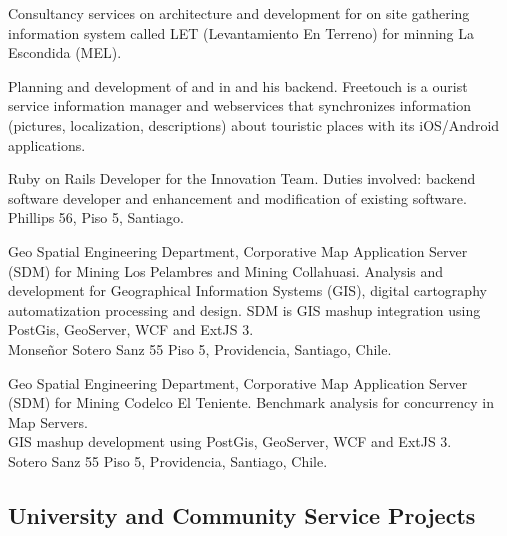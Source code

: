 \documentclass[11pt,letterpaper,roman]{moderncv}
\begin{document}
	 {\scd} {\jobbitgames} {\stgo} {}
	{Consultancy services on architecture and development for on site
	gathering information system called LET (Levantamiento En Terreno) for minning
	La Escondida (MEL).
	}

	 {\scd} {\mataveri} {\stgo} {}
	{Planning and development of \freetouchchile and \freetouchperu in
	\android and his backend.  Freetouch is a ourist service information manager and
	webservices that synchronizes information (pictures, localization, descriptions)
	about touristic places with its iOS/Android applications.
	}
	
	 {\se} {\multicaja} {\stgo} {}
	{Ruby on Rails Developer for the Innovation Team. Duties involved:
	backend software developer and enhancement and modification of existing
	software. \\
	Phillips 56, Piso 5, Santiago.
	}

	 {\se} {\ikom} {\stgo} {} {Geo Spatial Engineering
	Department, Corporative Map Application Server (SDM) for Mining Los Pelambres
	and Mining Collahuasi.  Analysis and development for Geographical Information
	Systems (GIS), digital cartography automatization processing and design.  SDM is
	GIS mashup integration using PostGis, GeoServer, WCF and ExtJS 3. 
	\\ Monse\~nor
	Sotero Sanz 55 Piso 5, Providencia, Santiago, Chile.}

	 {\intership} {\ikom} {\stgo} {}
	{Geo Spatial Engineering Department, Corporative Map Application Server
	(SDM) for  Mining Codelco El Teniente.  Benchmark analysis for concurrency in
	Map Servers. \\
	GIS mashup development using PostGis, GeoServer, WCF and ExtJS 3. 
	\\ Sotero Sanz
	55 Piso 5, Providencia, Santiago, Chile.}

\subsection{University and Community Service Projects}
\end{document}
